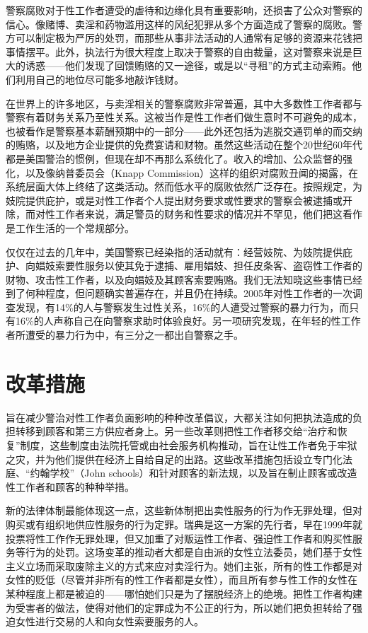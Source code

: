 \documentclass[fontset=fandol, a4paper, 12pt, openright]{ctexbook}
\begin{document}
警察腐败对于性工作者遭受的虐待和边缘化具有重要影响，还损害了公众对警察的信心。像赌博、卖淫和药物滥用这样的风纪犯罪从多个方面造成了警察的腐败。警方可以制定极为严厉的处罚，而那些从事非法活动的人通常有足够的资源来花钱把事情摆平。此外，执法行为很大程度上取决于警察的自由裁量，这对警察来说是巨大的诱惑——他们发现了回馈贿赂的又一途径，或是以“寻租”的方式主动索贿。他们利用自己的地位尽可能多地敲诈钱财。

在世界上的许多地区，与卖淫相关的警察腐败非常普遍，其中大多数性工作者都与警察有着财务关系乃至性关系。这被当作是性工作者们做生意时不可避免的成本，也被看作是警察基本薪酬预期中的一部分——此外还包括为逃脱交通罚单的而交纳的贿赂，以及地方企业提供的免费宴请和财物。虽然这些活动在整个20世纪60年代都是美国警治的惯例，但现在却不再那么系统化了。收入的增加、公众监督的强化，以及像纳普委员会（Knapp Commission）这样的组织对腐败丑闻的揭露，在系统层面大体上终结了这类活动。然而低水平的腐败依然广泛存在。按照规定，为妓院提供庇护，或是对性工作者个人提出财务要求或性要求的警察会被逮捕或开除，而对性工作者来说，满足警员的财务和性要求的情况并不罕见，他们把这看作是工作生活的一个常规部分。

仅仅在过去的几年中，美国警察已经染指的活动就有：经营妓院、为妓院提供庇护、向娼妓索要性服务以使其免于逮捕、雇用娼妓、担任皮条客、盗窃性工作者的财物、攻击性工作者，以及向娼妓及其顾客索要贿赂。我们无法知晓这些事情已经到了何种程度，但问题确实普遍存在，并且仍在持续。2005年对性工作者的一次调查发现，有14\%的人与警察发生过性关系，16\%的人遭受过警察的暴力行为，而只有16\%的人声称自己在向警察求助时体验良好。另一项研究发现，在年轻的性工作者所遭受的暴力行为中，有三分之一都出自警察之手。

\section{改革措施}

旨在减少警治对性工作者负面影响的种种改革倡议，大都关注如何把执法造成的负担转移到顾客和第三方供应者身上。另一些改革则把性工作者移交给“治疗和恢复”制度，这些制度由法院托管或由社会服务机构推动，旨在让性工作者免于牢狱之灾，并为他们提供在经济上自给自足的出路。这些改革措施包括设立专门化法庭、“约翰学校”（John schools）和针对顾客的新法规，以及旨在制止顾客或改造性工作者和顾客的种种举措。

新的法律体制最能体现这一点，这些新体制把出卖性服务的行为作无罪处理，但对购买或有组织地供应性服务的行为定罪。瑞典是这一方案的先行者，早在1999年就投票将性工作作无罪处理，但又加重了对贩运性工作者、强迫性工作者和购买性服务等行为的处罚。这场变革的推动者大都是自由派的女性立法委员，她们基于女性主义立场而采取废除主义的方式来应对卖淫行为。她们主张，所有的性工作都是对女性的贬低（尽管并非所有的性工作者都是女性），而且所有参与性工作的女性在某种程度上都是被迫的——哪怕她们只是为了摆脱经济上的绝境。把性工作者构建为受害者的做法，使得对他们的定罪成为不公正的行为，所以她们把负担转给了强迫女性进行交易的人和向女性索要服务的人。
\end{document}
